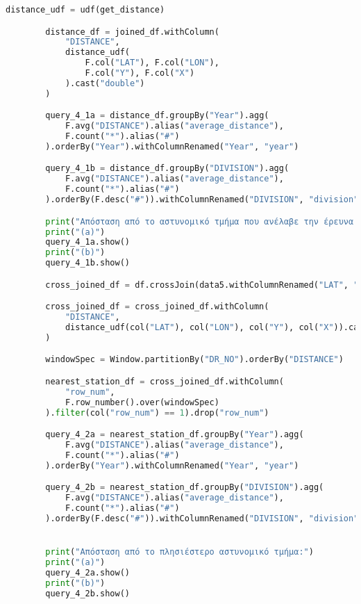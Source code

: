 \documentclass{article}
\begin{document}
\begin{lstlisting}[language = Python]
        distance_udf = udf(get_distance)

        distance_df = joined_df.withColumn(
            "DISTANCE",
            distance_udf(
                F.col("LAT"), F.col("LON"),
                F.col("Y"), F.col("X")
            ).cast("double")
        )

        query_4_1a = distance_df.groupBy("Year").agg(
            F.avg("DISTANCE").alias("average_distance"),
            F.count("*").alias("#")
        ).orderBy("Year").withColumnRenamed("Year", "year")

        query_4_1b = distance_df.groupBy("DIVISION").agg(
            F.avg("DISTANCE").alias("average_distance"),
            F.count("*").alias("#")
        ).orderBy(F.desc("#")).withColumnRenamed("DIVISION", "division")

        print("Απόσταση από το αστυνομικό τμήμα που ανέλαβε την έρευνα για το περιστατικό:")
        print("(a)")
        query_4_1a.show() 
        print("(b)")
        query_4_1b.show() 

        cross_joined_df = df.crossJoin(data5.withColumnRenamed("LAT", "Y").withColumnRenamed("LON", "X"))

        cross_joined_df = cross_joined_df.withColumn(
            "DISTANCE",
            distance_udf(col("LAT"), col("LON"), col("Y"), col("X")).cast("double")
        )

        windowSpec = Window.partitionBy("DR_NO").orderBy("DISTANCE")

        nearest_station_df = cross_joined_df.withColumn(
            "row_num",
            F.row_number().over(windowSpec)
        ).filter(col("row_num") == 1).drop("row_num")

        query_4_2a = nearest_station_df.groupBy("Year").agg(
            F.avg("DISTANCE").alias("average_distance"),
            F.count("*").alias("#")
        ).orderBy("Year").withColumnRenamed("Year", "year")

        query_4_2b = nearest_station_df.groupBy("DIVISION").agg(
            F.avg("DISTANCE").alias("average_distance"),
            F.count("*").alias("#")
        ).orderBy(F.desc("#")).withColumnRenamed("DIVISION", "division")


        print("Απόσταση από το πλησιέστερο αστυνομικό τμήμα:")
        print("(a)")
        query_4_2a.show()
        print("(b)")
        query_4_2b.show()
\end{lstlisting}

\vspace{5cm}
\end{document}

